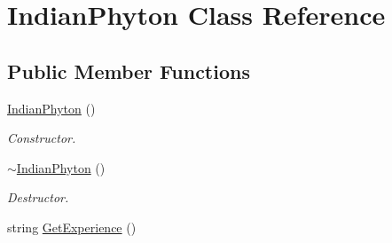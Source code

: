 \hypertarget{class_indian_phyton}{}\section{Indian\+Phyton Class Reference}
\label{class_indian_phyton}
\subsection*{Public Member Functions}
\begin{DoxyCompactItemize}
\item 
\hyperlink{class_indian_phyton_ac10885d0edb63c66f897ced1e7af87d4}{Indian\+Phyton} ()\hypertarget{class_indian_phyton_ac10885d0edb63c66f897ced1e7af87d4}{}\label{class_indian_phyton_ac10885d0edb63c66f897ced1e7af87d4}

\begin{DoxyCompactList}\small\item\em Constructor. \end{DoxyCompactList}\item 
\hyperlink{class_indian_phyton_aa22d4887553ad6fe5cd120c2ae8b953e}{$\sim$\+Indian\+Phyton} ()\hypertarget{class_indian_phyton_aa22d4887553ad6fe5cd120c2ae8b953e}{}\label{class_indian_phyton_aa22d4887553ad6fe5cd120c2ae8b953e}

\begin{DoxyCompactList}\small\item\em Destructor. \end{DoxyCompactList}\item 
string \hyperlink{class_indian_phyton_aeea982676d703fda0dff1c8d6661db81}{Get\+Experience} ()\hypertarget{class_indian_phyton_aeea982676d703fda0dff1c8d6661db81}{}\label{class_indian_phyton_aeea982676d703fda0dff1c8d6661db81}


\end{DoxyCompactItemize}
